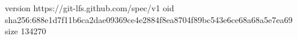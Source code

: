 version https://git-lfs.github.com/spec/v1
oid sha256:688e1d7f11b6ca2dae09369ce4e2884f8ea8704f89bc543e6ce68a68a5e7ea69
size 134270
